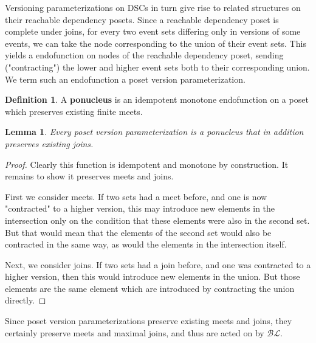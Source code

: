 \documentclass[hoptionsi,review,format=acmsmall]{acmart}
\newtheorem{lemma}[theorem]{Lemma}
\theoremstyle{definition}
\newtheorem{definition}{Definition}[section]
\newcommand{\BLc}{\mathcal{BL}}
\begin{document}

Versioning parameterizations on DSCs in turn give rise to related structures on their reachable dependency posets. Since a reachable dependency poset is complete under joins, for every two event sets differing only in versions of some events, we can take the node corresponding to the union of their event sets. This yields a  endofunction on nodes of the reachable dependency poset, sending ("contracting") the lower and higher event sets both to their corresponding union. We term such an endofunction a poset version parameterization.

\begin{definition}
A \textbf{ponucleus} is an idempotent monotone endofunction on a poset which preserves existing finite meets.
\end{definition}

\begin{lemma}
Every poset version parameterization is a ponucleus that in addition preserves existing joins.
\end{lemma}

\begin{proof}
Clearly this function is idempotent and monotone by construction. It remains to show it preserves meets and joins.

First we consider meets. If two sets had a meet before, and one is now "contracted" to a higher version, this may introduce new elements in the intersection only on the condition that these elements were also in the second set. But that would mean that the elements of the second set would also be contracted in the same way, as would the elements in the intersection itself.

Next, we consider joins. If two sets had a join before, and one was contracted to a higher version, then this would introduce new elements in the union. But those elements are the same element which are introduced by contracting the union directly.
\end{proof}

Since poset version parameterizations preserve existing meets and joins, they certainly preserve meets and maximal joins, and thus are acted on by \(\BLc\).
\end{document}
